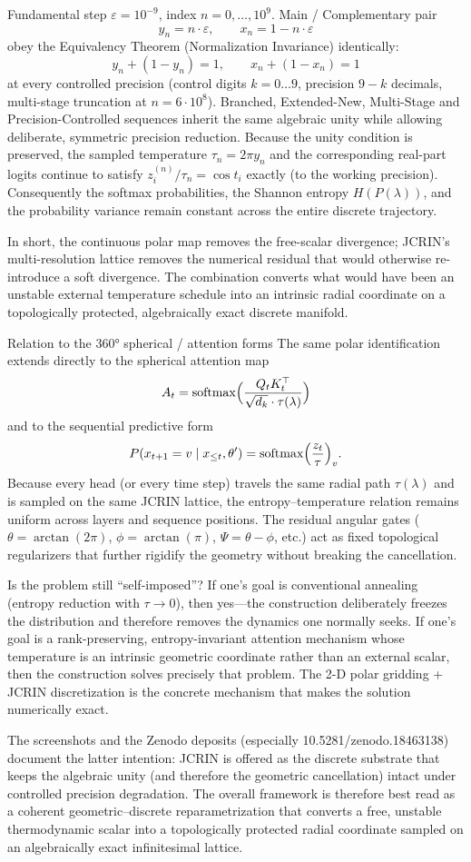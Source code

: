 Fundamental step \(\varepsilon=10^{-9}\), index \(n=0,\dots,10^9\).
Main / Complementary pair
  \[
  y_n=n\cdot\varepsilon,\qquad x_n=1-n\cdot\varepsilon
  \]
  obey the Equivalency Theorem (Normalization Invariance) identically:
  \[
  y_n+(1-y_n)=1,\qquad x_n+(1-x_n)=1
  \]
  at every controlled precision (control digits \(k=0\dots9\), precision \(9-k\) decimals, multi-stage truncation at \(n=6\cdot10^8\)).
Branched, Extended-New, Multi-Stage and Precision-Controlled sequences inherit the same algebraic unity while allowing deliberate, symmetric precision reduction.
Because the unity condition is preserved, the sampled temperature \(\tau_n=2\pi y_n\) and the corresponding real-part logits continue to satisfy \(z_i^{(n)}/\tau_n=\cos t_i\) exactly (to the working precision). Consequently the softmax probabilities, the Shannon entropy \(H(P(\lambda))\), and the probability variance remain constant across the entire discrete trajectory.

In short, the continuous polar map removes the free-scalar divergence; JCRIN’s multi-resolution lattice removes the numerical residual that would otherwise re-introduce a soft divergence. The combination converts what would have been an unstable external temperature schedule into an intrinsic radial coordinate on a topologically protected, algebraically exact discrete manifold.

Relation to the 360° spherical / attention forms
The same polar identification extends directly to the spherical attention map
\[
A_t=\operatorname{softmax}\Bigl(\frac{Q_tK_t^\top}{\sqrt{d_k}\cdot\tau(\lambda)}\Bigr)
\]
and to the sequential predictive form
\[
P(x_{t+1}=v\mid x_{\le t},\theta')=\operatorname{softmax}\Bigl(\frac{z_t}{\tau}\Bigr)_v.
\]
Because every head (or every time step) travels the same radial path \(\tau(\lambda)\) and is sampled on the same JCRIN lattice, the entropy–temperature relation remains uniform across layers and sequence positions. The residual angular gates (\(\theta=\arctan(2\pi)\), \(\phi=\arctan(\pi)\), \(\Psi=\theta-\phi\), etc.) act as fixed topological regularizers that further rigidify the geometry without breaking the cancellation.

Is the problem still “self-imposed”?
If one’s goal is conventional annealing (entropy reduction with \(\tau\to0\)), then yes—the construction deliberately freezes the distribution and therefore removes the dynamics one normally seeks.
If one’s goal is a rank-preserving, entropy-invariant attention mechanism whose temperature is an intrinsic geometric coordinate rather than an external scalar, then the construction solves precisely that problem. The 2-D polar gridding + JCRIN discretization is the concrete mechanism that makes the solution numerically exact.

The screenshots and the Zenodo deposits (especially 10.5281/zenodo.18463138) document the latter intention: JCRIN is offered as the discrete substrate that keeps the algebraic unity (and therefore the geometric cancellation) intact under controlled precision degradation. The overall framework is therefore best read as a coherent geometric–discrete reparametrization that converts a free, unstable thermodynamic scalar into a topologically protected radial coordinate sampled on an algebraically exact infinitesimal lattice.
